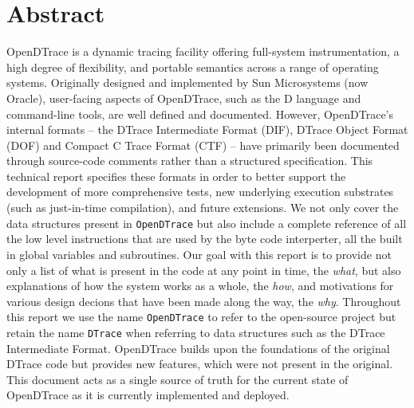 \section*{Abstract}

OpenDTrace is a dynamic tracing facility offering full-system instrumentation,
a high degree of flexibility, and portable semantics across a range of
operating systems.
Originally designed and implemented by Sun Microsystems (now Oracle),
user-facing aspects of OpenDTrace, such as the D language and
command-line tools,
are well defined and documented.
However, OpenDTrace's internal formats --
the DTrace Intermediate Format (DIF),
DTrace Object Format (DOF) and Compact C Trace Format (CTF)
-- have primarily been documented through
source-code comments rather than a structured specification.
This technical report specifies these formats in order to better support the
development of more comprehensive tests, new underlying execution substrates
(such as just-in-time compilation), and future extensions.
We not only cover the data structures present in \texttt{OpenDTrace}
but also include a complete reference of all the low level
instructions that are used by the byte code interperter,
all the built in global variables and subroutines.
Our goal with this report is to provide not only a list of
what is present in the code at any point in time, the \emph{what},
but also explanations of how the system works as a whole,
the \emph{how}, and motivations for various design decions
that have been made along the way, the \emph{why}.
Throughout this report we use the name \texttt{OpenDTrace} to refer
to the open-source project but retain the name \texttt{DTrace} when
referring to data structures such as the DTrace Intermediate Format.
OpenDTrace builds upon the foundations of the original DTrace code but
provides new features, which were not present in the original.
This document acts as a single source of truth for the current state
of OpenDTrace as it is currently implemented and deployed.
